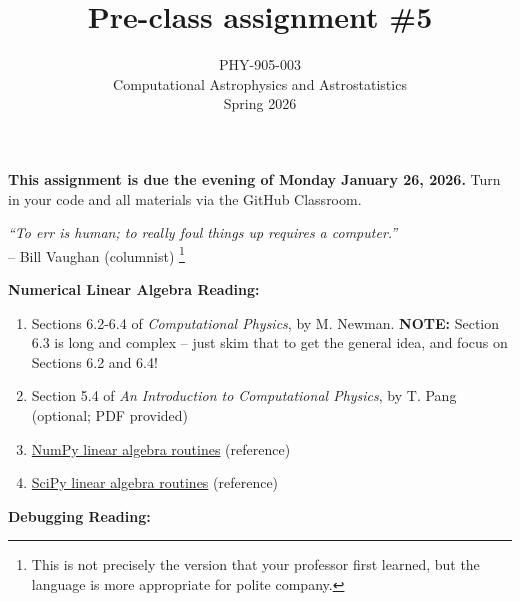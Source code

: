 \documentclass[10pt]{article}
\title{Pre-class assignment \#5}
\author{PHY-905-003\\Computational Astrophysics and
  Astrostatistics\\Spring 2026}
\date{} %
\begin{document}
 
\maketitle

\vspace{-5mm}

\noindent
\textbf{This assignment is due the evening of Monday January 26, 2026.}
 Turn in your code and all materials via the GitHub Classroom.

\vspace{5mm}

\begin{center}
\textit{``To err is human; to really foul things up requires
a computer.''} \\-- Bill Vaughan (columnist) \footnote{This is not
precisely the version that your professor first learned, but the
language is more
appropriate for polite company.}
\end{center}

\vspace{5mm}

\noindent
\textbf{Numerical Linear Algebra Reading:}

\begin{enumerate}

\item Sections 6.2-6.4 of \textit{Computational Physics}, by
  M. Newman.  \textbf{NOTE:}  Section 6.3 is long and complex -- just
  skim that to get the general idea, and focus on Sections 6.2 and 6.4!

\item Section 5.4 of \textit{An Introduction to Computational Physics},
  by T. Pang (optional; PDF provided)

\item 
  \href{https://docs.scipy.org/doc/numpy/reference/routines.linalg.html}{NumPy
  linear algebra routines}  (reference)

\item 
  \href{https://docs.scipy.org/doc/scipy/reference/linalg.html}{SciPy
  linear algebra routines}  (reference)

\end{enumerate}


\vspace{3mm}

\noindent
\textbf{Debugging Reading:}
\end{document}
